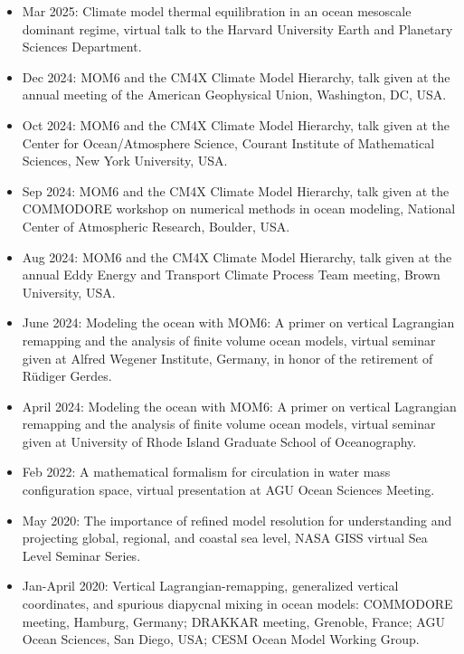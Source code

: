 \begin{itemize}[leftmargin=*]

\item Mar 2025: {\sc Climate model thermal equilibration in an ocean mesoscale dominant regime}, virtual talk to the Harvard University Earth and Planetary Sciences Department.

\item Dec 2024: {\sc MOM6 and the CM4X Climate Model Hierarchy}, talk given at the annual meeting of the American Geophysical Union, Washington, DC, USA. 

\item Oct 2024: {\sc MOM6 and the CM4X Climate Model Hierarchy}, talk given at the Center for Ocean/Atmosphere Science, Courant Institute of Mathematical Sciences, New York University, USA. 

\item Sep 2024: {\sc MOM6 and the CM4X Climate Model Hierarchy}, talk given at the COMMODORE workshop on numerical methods in ocean modeling, National Center of Atmospheric Research, Boulder, USA. 

\item Aug 2024: {\sc MOM6 and the CM4X Climate Model Hierarchy}, talk given at the annual Eddy Energy and Transport Climate Process Team meeting, Brown University, USA. 

\item June 2024: {\sc Modeling the ocean with MOM6: A primer on vertical Lagrangian remapping and the analysis of finite volume ocean models}, virtual seminar given at Alfred Wegener Institute, Germany, in honor of the retirement of {R\"{u}diger} Gerdes. 

\item April 2024: {\sc Modeling the ocean with MOM6: A primer on vertical Lagrangian remapping and the analysis of finite volume ocean models}, virtual seminar given at University of Rhode Island Graduate School of Oceanography. 

\item Feb 2022: {\sc A mathematical formalism for circulation in water mass configuration space}, virtual presentation at AGU Ocean Sciences Meeting.

\item May 2020: {\sc The importance of refined model resolution for understanding and projecting global, regional, and coastal sea level}, NASA GISS virtual Sea Level Seminar Series. 

\item Jan-April 2020: {\sc Vertical Lagrangian-remapping, generalized vertical coordinates, and spurious diapycnal mixing in ocean
  models}: COMMODORE meeting, Hamburg, Germany; DRAKKAR meeting, Grenoble, France; AGU Ocean Sciences, San Diego, USA; CESM Ocean Model Working Group.  


\end{itemize}
